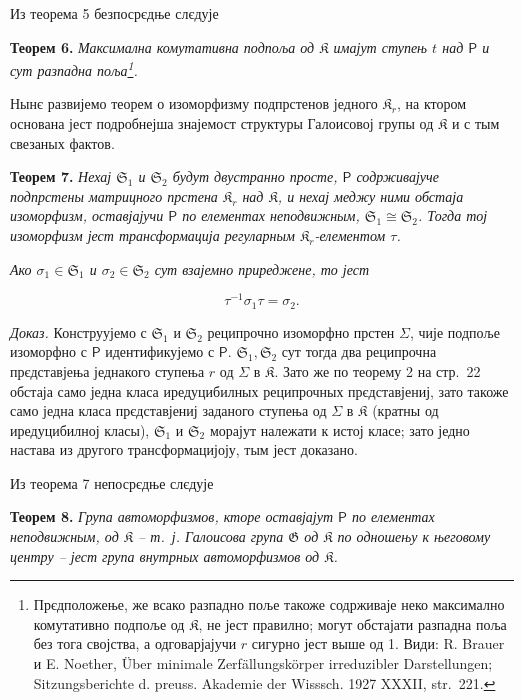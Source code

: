 \documentclass[11pt]{article}
\newcommand{\srcfn}[2]{\footnote{#2}}
\newcommand{\foreign}[1]{#1}
\begin{document}
Из теорема 5 безпосрєдње слєдује

\textbf{Теорем 6.} \emph{Максимална комутативна подпоља од \(\mathfrak K\) имајут ступењ \(t\) над \(\mathsf P\) и сут разпадна поља\srcfn{1}{Прєдположење, же всако разпадно поље такоже содрживаје неко максимално комутативно подпоље од \(\mathfrak K\), не јест правилно; могут обстајати разпадна поља без тога својства, а одговарјајучи \(r\) сигурно јест выше од 1. Види: \foreign{R. Brauer} и \foreign{E. Noether}, \foreign{Über minimale Zerfällungskörper irreduzibler Darstellungen; Sitzungsberichte d. preuss. Akademie der Wisssch. 1927 XXXII, str.~221.}}.}

Нынє развијемо теорем о изоморфизму подпрстенов једного \(\mathfrak K_r\), на ктором основана јест подробнејша знајемост структуры Галоисовој групы од \(\mathfrak K\) и с тым свезаных фактов.

\textbf{Теорем 7.} \emph{Нехај \(\mathfrak S_1\) и \(\mathfrak S_2\) будут двустранно просте, \(\mathsf P\) содрживајуче подпрстены матрицного прстена \(\mathfrak K_r\) над \(\mathfrak K\), и нехај меджу ними обстаја изоморфизм, оставјајучи \(\mathsf P\) по елементах неподвижным, \(\mathfrak S_1\cong\mathfrak S_2\). Тогда тој изоморфизм јест трансформација регуларным \(\mathfrak K_r\)-елементом \(\tau\).}

\emph{Ако \(\sigma_1\in\mathfrak S_1\) и \(\sigma_2\in\mathfrak S_2\) сут взајемно приреджене, то јест}

\[
\tau^{-1}\sigma_1\tau=\sigma_2.
\]

\emph{Доказ.} Конструујемо с \(\mathfrak S_1\) и \(\mathfrak S_2\) реципрочно изоморфно прстен \(\Sigma\), чије подпоље изоморфно с \(\mathsf P\) идентификујемо с \(\mathsf P\). \(\mathfrak S_1,\mathfrak S_2\) сут тогда два реципрочна прєдставјења једнакого ступења \(r\) од \(\Sigma\) в \(\mathfrak K\). Зато же по теорему 2 на стр.~22 обстаја само једна класа иредуцибилных реципрочных прєдставјениј, зато такоже само једна класа прєдставјениј заданого ступења од \(\Sigma\) в \(\mathfrak K\) (кратны од иредуцибилној класы), \(\mathfrak S_1\) и \(\mathfrak S_2\) морајут належати к истој класе; зато једно настава из другого трансформацијоју, тым јест доказано.

Из теорема 7 непосрєдње слєдује

\textbf{Теорем 8.} \emph{Група автоморфизмов, кторе оставјајут \(\mathsf P\) по елементах неподвижным, од \(\mathfrak K\) -- т.~ј. Галоисова група \(\mathfrak G\) од \(\mathfrak K\) по одношењу к његовому центру -- јест група внутрных автоморфизмов од \(\mathfrak K\).}
\end{document}
